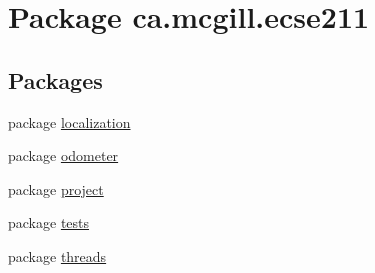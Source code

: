 \hypertarget{namespaceca_1_1mcgill_1_1ecse211}{}\section{Package ca.\+mcgill.\+ecse211}
\label{namespaceca_1_1mcgill_1_1ecse211}
\subsection*{Packages}
\begin{DoxyCompactItemize}
\item 
package \hyperlink{namespaceca_1_1mcgill_1_1ecse211_1_1localization}{localization}
\item 
package \hyperlink{namespaceca_1_1mcgill_1_1ecse211_1_1odometer}{odometer}
\item 
package \hyperlink{namespaceca_1_1mcgill_1_1ecse211_1_1project}{project}
\item 
package \hyperlink{namespaceca_1_1mcgill_1_1ecse211_1_1tests}{tests}
\item 
package \hyperlink{namespaceca_1_1mcgill_1_1ecse211_1_1threads}{threads}
\end{DoxyCompactItemize}
